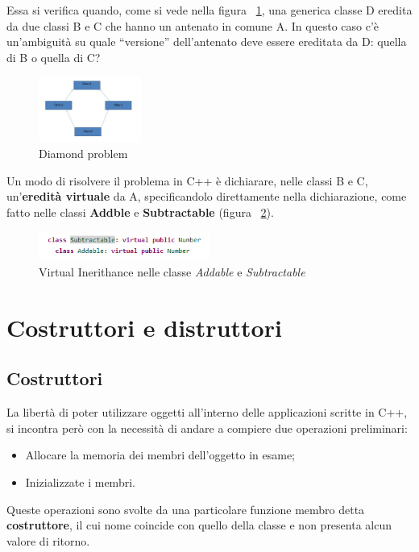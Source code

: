 Essa si verifica quando, come si vede nella figura ~\ref{fig:DiamondProblem}, una generica classe D eredita da due classi B e C che hanno un antenato in comune A. In questo caso c'è un'ambiguità su quale “versione” dell'antenato deve essere ereditata da D: quella di B o quella di C?

\begin{figure}[h]
	\centering
	\includegraphics[width=0.3\textwidth]{Immagini/DiamondProblem.png}
	\caption{Diamond problem}
	\label{fig:DiamondProblem}
\end{figure}

Un modo di risolvere il problema in C++ è dichiarare, nelle classi B e C, un'\textbf{eredità virtuale} da A, specificandolo direttamente nella dichiarazione, come fatto nelle classi \textbf{Addble} e \textbf{Subtractable} (figura ~\ref{fig:VirtualInerithance}).

\begin{figure}[h]
	\centering
	\includegraphics[width=0.5\textwidth]{Immagini/VirtualInerithance.png}
	\caption{Virtual Inerithance nelle classe \textit{Addable} e \textit{Subtractable}}
	\label{fig:VirtualInerithance}
\end{figure}

\section{Costruttori e distruttori}
\subsection{Costruttori}
La libertà di poter utilizzare oggetti all'interno delle applicazioni scritte in C++, si incontra però con la necessità di andare a compiere due operazioni preliminari:
\begin{itemize}
	\item Allocare la memoria dei membri dell'oggetto in esame;
	\item Inizializzate i membri.
\end{itemize}
Queste operazioni sono svolte da una particolare funzione membro detta \textbf{costruttore}, il cui nome coincide con quello della classe e non presenta alcun valore di ritorno.

